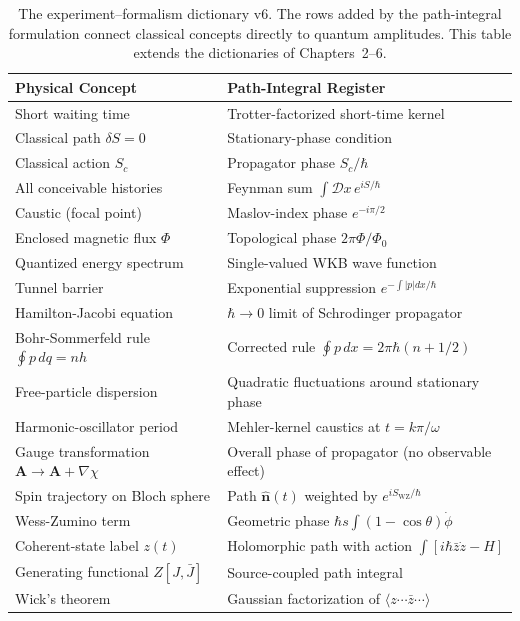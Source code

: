 \begin{table}[htbp]
\centering
\caption{The experiment--formalism dictionary v6. The rows added by the path-integral formulation connect classical concepts directly to quantum amplitudes. This table extends the dictionaries of Chapters~2--6.}
\label{tab:ch9-dictionary}
\renewcommand{\arraystretch}{1.4}
\begin{tabular}{p{} p{}}
\toprule
\textbf{Physical Concept} & \textbf{Path-Integral Register} \\
\midrule
Short waiting time & Trotter-factorized short-time kernel \\
Classical path $\delta S = 0$ & Stationary-phase condition \\
Classical action $S_c$ & Propagator phase $S_c/\hbar$ \\
All conceivable histories & Feynman sum $\int\mathcal{D}x\,e^{iS/\hbar}$ \\
Caustic (focal point) & Maslov-index phase $e^{-i\pi/2}$ \\
Enclosed magnetic flux $\Phi$ & Topological phase $2\pi\Phi/\Phi_0$ \\
Quantized energy spectrum & Single-valued WKB wave function \\
Tunnel barrier & Exponential suppression $e^{-\int|p|dx/\hbar}$ \\
Hamilton-Jacobi equation & $\hbar\to 0$ limit of Schrodinger propagator \\
Bohr-Sommerfeld rule $\oint p\,dq = nh$ & Corrected rule $\oint p\,dx = 2\pi\hbar(n+1/2)$ \\
Free-particle dispersion & Quadratic fluctuations around stationary phase \\
Harmonic-oscillator period & Mehler-kernel caustics at $t = k\pi/\omega$ \\
Gauge transformation $\bm A\to\bm A+\nabla\chi$ & Overall phase of propagator (no observable effect) \\
Spin trajectory on Bloch sphere & Path $\hat{\bm n}(t)$ weighted by $e^{iS_{\mathrm{WZ}}/\hbar}$ \\
Wess-Zumino term & Geometric phase $\hbar s\int(1-\cos\theta)\dot{\phi}$ \\
Coherent-state label $z(t)$ & Holomorphic path with action $\int[i\hbar\bar z\dot z - H]$ \\
Generating functional $Z[J,\bar J]$ & Source-coupled path integral \\
Wick's theorem & Gaussian factorization of $\langle z\cdots\bar z\cdots\rangle$ \\
\bottomrule
\end{tabular}
\end{table}

